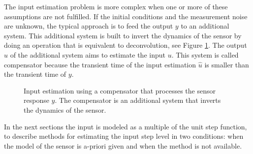 The input estimation problem is more complex when one or more of these assumptions are not fulfilled.
If the initial conditions and the measurement noise are unknown, the typical approach is to feed the output ${y}$ to an additional system.
This additional system is built to invert the dynamics of the sensor by doing an operation that is equivalent to deconvolution, see Figure \ref{fig:compensator}.
The output $\widehat{{u}}$ of the additional system aims to estimate the input ${u}$.
This system is called compensator because the transient time of the input estimation $\widehat{{u}}$ is smaller than the transient time of ${y}$.  

\begin{figure}[htb!]
\centering
{}
 \caption{Input estimation using a compensator that processes the sensor response ${y}$. The compensator is an additional system that \color{blue} inverts \color{black} the dynamics of the sensor.} \label{fig:compensator}
 \end{figure}

In the next sections the input is modeled as a multiple of the unit step function, to describe methods for estimating the input step level in two conditions: when the model of the sensor is a-priori given and when the method is not available. 

